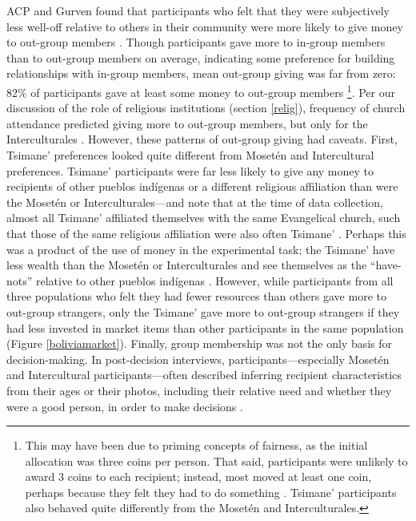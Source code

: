 \documentclass[bibauthoryear]{aa}
\begin{document}
ACP and Gurven found that participants who felt that they were subjectively less well-off relative to others in their community were more likely to give money to out-group members \citep{pisor2016risk}. Though participants gave more to in-group members than to out-group members on average, indicating some preference for building relationships with in-group members, mean out-group giving was far from zero: 82\% of participants gave at least some money to out-group members \citep{pisor2018diversify}\footnote{This may have been due to priming concepts of fairness, as the initial allocation was three coins per person. That said, participants were unlikely to award 3 coins to each recipient; instead, most moved at least one coin, perhaps because they felt they had to do something \citep{list2007interpretation}. Tsimane' participants also behaved quite differently from the Moset\'en and Interculturales.}. Per our discussion of the role of religious institutions (section \ref{relig}), frequency of church attendance predicted giving more to out-group members, but only for the Interculturales \citep{pisor2016risk}. However, these patterns of out-group giving had caveats. First, Tsimane' preferences looked quite different from Moset\'en and Intercultural preferences. Tsimane' participants were far less likely to give any money to recipients of other pueblos ind\'igenas or a different religious affiliation than were the Moset\'en or Interculturales---and note that at the time of data collection, almost all Tsimane' affiliated themselves with the same Evangelical church, such that those of the same religious affiliation were also often Tsimane' \citep{pisor2018diversify}. Perhaps this was a product of the use of money in the experimental task; the Tsimane' have less wealth than the Moset\'en or Interculturales and see themselves as the ``have-nots'' relative to other pueblos ind\'igenas \citep{pisor2018diversify}. However, while participants from all three populations who felt they had fewer resources than others gave more to out-group strangers, only the Tsimane' gave more to out-group strangers if they had less invested in market items than other participants in the same population (Figure \ref{boliviamarket}). Finally, group membership was not the only basis for decision-making. In post-decision interviews, participants---especially Moset\'en and Intercultural participants---often described inferring recipient characteristics from their ages or their photos, including their relative need and whether they were a good person, in order to make decisions \citep{pisor2018diversify, Pisor2020}.
\end{document}
